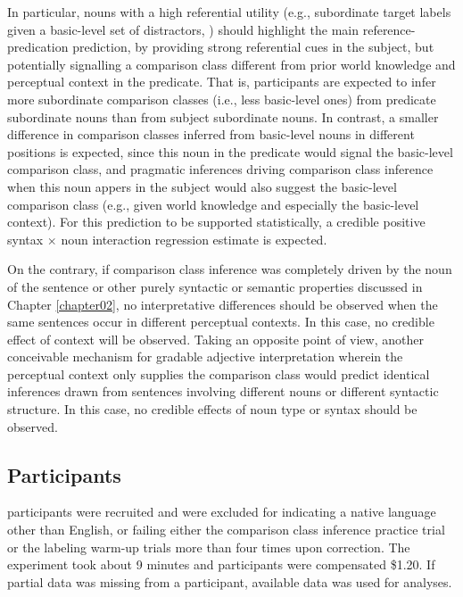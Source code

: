 In particular, nouns with a high referential utility (e.g., subordinate target labels given a basic-level set of distractors, \textcite[cf.][]{graf2016animal}) should highlight the main reference-predication prediction, by providing strong referential cues in the subject, but potentially signalling a comparison class different from prior world knowledge and perceptual context in the predicate. That is, participants are expected to infer more subordinate comparison classes (i.e., less basic-level ones) from predicate subordinate nouns than from subject subordinate nouns. In contrast, a smaller difference in comparison classes inferred from basic-level nouns in different positions is expected, since this noun in the predicate would signal the basic-level comparison class, and pragmatic inferences driving comparison class inference when this noun appers in the subject would also suggest the basic-level comparison class (e.g., given world knowledge and especially the basic-level context). 
For this prediction to be supported statistically, a credible positive syntax $\times$ noun interaction regression estimate is expected.
 
On the contrary, if comparison class inference was completely driven by the noun of the sentence or other purely syntactic or semantic properties discussed in Chapter \ref{chapter02}, no interpretative differences should be observed when the same sentences occur in different perceptual contexts. In this case, no credible effect of context will be observed. Taking an opposite point of view, another conceivable mechanism for gradable adjective interpretation wherein the perceptual context only supplies the comparison class would predict identical inferences drawn from sentences involving different nouns or different syntactic structure. In this case, no credible effects of noun type or syntax should be observed. 

\subsection{Participants}
 participants were recruited and  were excluded for indicating a native language other than English, or failing either the comparison class inference practice trial or the labeling warm-up trials more than four times upon correction. The experiment took about 9 minutes and participants were compensated \$1.20. If partial data was missing from a participant, available data was used for analyses. 
